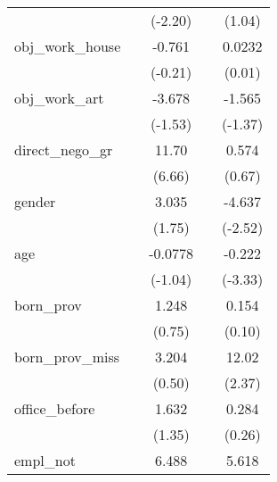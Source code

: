 {\begin{tabular}{l*{4}{c}}
            &                     &     (-2.20)         &                     &      (1.04)         \\
[1em]
obj\_work\_house&                     &      -0.761         &                     &      0.0232         \\
            &                     &     (-0.21)         &                     &      (0.01)         \\
[1em]
obj\_work\_art&                     &      -3.678         &                     &      -1.565         \\
            &                     &     (-1.53)         &                     &     (-1.37)         \\
[1em]
direct\_nego\_gr&                     &       11.70\sym{***}&                     &       0.574         \\
            &                     &      (6.66)         &                     &      (0.67)         \\
[1em]
gender      &                     &       3.035         &                     &      -4.637\sym{*}  \\
            &                     &      (1.75)         &                     &     (-2.52)         \\
[1em]
age         &                     &     -0.0778         &                     &      -0.222\sym{***}\\
            &                     &     (-1.04)         &                     &     (-3.33)         \\
[1em]
born\_prov   &                     &       1.248         &                     &       0.154         \\
            &                     &      (0.75)         &                     &      (0.10)         \\
[1em]
born\_prov\_miss&                     &       3.204         &                     &       12.02\sym{*}  \\
            &                     &      (0.50)         &                     &      (2.37)         \\
[1em]
office\_before&                     &       1.632         &                     &       0.284         \\
            &                     &      (1.35)         &                     &      (0.26)         \\
[1em]
empl\_not    &                     &       6.488\sym{*}  &                     &       5.618         \\

\end{tabular}}
